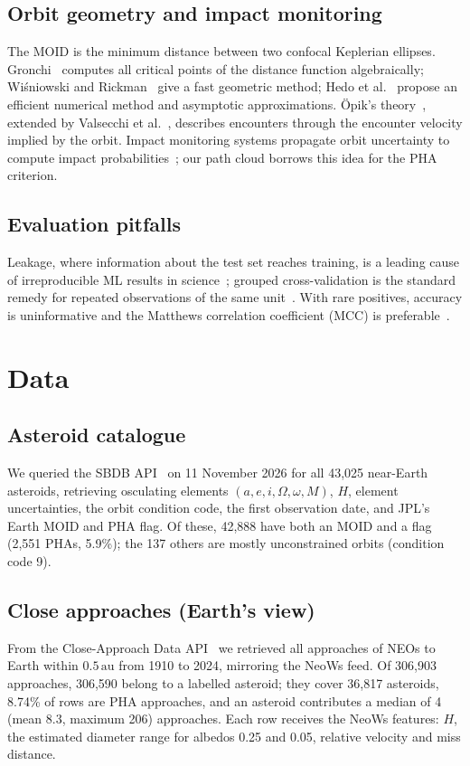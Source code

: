 \documentclass[conference]{IEEEtran}
\newcommand{\au}{\,\mathrm{au}}
\begin{document}
\subsection{Orbit geometry and impact monitoring}
The MOID is the minimum distance between two confocal Keplerian ellipses. Gronchi~\cite{gronchi2005} computes all critical points of the distance function algebraically; Wiśniowski and Rickman~\cite{wisniowski2013} give a fast geometric method; Hedo et al.~\cite{hedo2018,hedo2020} propose an efficient numerical method and asymptotic approximations. Öpik's theory~\cite{opik1976}, extended by Valsecchi et al.~\cite{valsecchi2003}, describes encounters through the encounter velocity implied by the orbit. Impact monitoring systems propagate orbit uncertainty to compute impact probabilities~\cite{milani2005,roa2021,milani_gronchi2009}; our path cloud borrows this idea for the PHA criterion.

\subsection{Evaluation pitfalls}
Leakage, where information about the test set reaches training, is a leading cause of irreproducible ML results in science~\cite{kaufman2012,kapoor2023}; grouped cross-validation is the standard remedy for repeated observations of the same unit~\cite{roberts2017}. With rare positives, accuracy is uninformative and the Matthews correlation coefficient (MCC) is preferable~\cite{chicco2020}.

\section{Data}

\subsection{Asteroid catalogue}
We queried the SBDB API~\cite{jpl_sbdb_api} on 11 November 2026 for all 43,025 near-Earth asteroids, retrieving osculating elements $(a, e, i, \Omega, \omega, M)$, $H$, element uncertainties, the orbit condition code, the first observation date, and JPL's Earth MOID and PHA flag. Of these, 42,888 have both an MOID and a flag (2,551 PHAs, 5.9\%); the 137 others are mostly unconstrained orbits (condition code 9).

\subsection{Close approaches (Earth's view)}\label{sec:cad}
From the Close-Approach Data API~\cite{jpl_cad_api} we retrieved all approaches of NEOs to Earth within $0.5\au$ from 1910 to 2024, mirroring the NeoWs feed. Of 306,903 approaches, 306,590 belong to a labelled asteroid; they cover 36,817 asteroids, 8.74\% of rows are PHA approaches, and an asteroid contributes a median of 4 (mean 8.3, maximum 206) approaches. Each row receives the NeoWs features: $H$, the estimated diameter range for albedos 0.25 and 0.05, relative velocity and miss distance.
\end{document}
